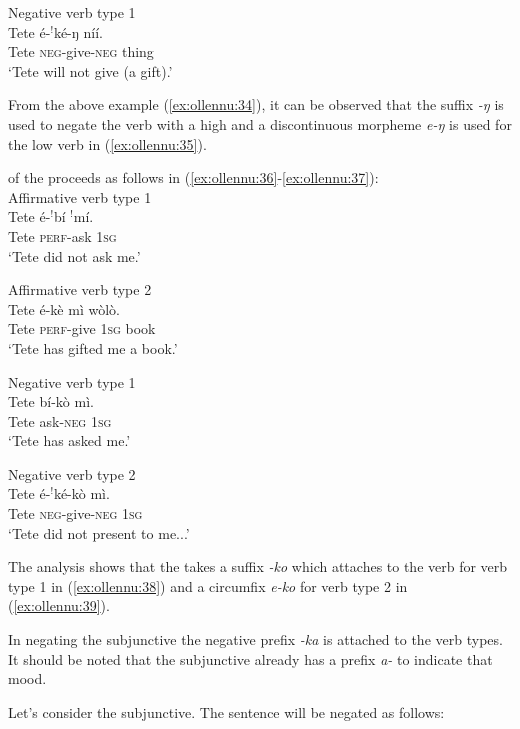 \documentclass[output=paper,newtxmath,modfonts,nonflat,draftmode]{langsci/langscibook}
\begin{document}
\ea Negative verb type 1 \\ \label{ex:ollennu:35}
\gll Tete é-$^{!}$ké-ŋ níí.\\
Tete \textsc{neg}-give-\textsc{neg} thing\\
\glt `Tete will not give (a gift).'\\
\z

From the above example (\ref{ex:ollennu:34}), it can be observed that the suffix \textit{-ŋ} is used to negate the verb with a high  and a discontinuous morpheme \textit{e-ŋ} is used for the low  verb in (\ref{ex:ollennu:35}).

 of the  proceeds as follows in (\ref{ex:ollennu:36}-\ref{ex:ollennu:37}):\\

\ea Affirmative verb type 1 \\\label{ex:ollennu:36}
\gll Tete é-$^{!}$bí $^{!}$mí.\\
Tete \textsc{perf}-ask 1\textsc{sg}\\
\glt `Tete did not ask me.'
\z


\ea Affirmative verb type 2 \\ \label{ex:ollennu:37}
\gll Tete é-kè mì wòlò.\\
Tete \textsc{perf}-give 1\textsc{sg} book\\
\glt `Tete has gifted me a book.'
\z


\ea Negative verb type 1 \\ \label{ex:ollennu:38}
\gll Tete bí-kò mì.\\
Tete ask-\textsc{neg} 1\textsc{sg}\\
\glt `Tete has asked me.'
\z


\ea Negative verb type 2 \\  \label{ex:ollennu:39}
 \gll Tete é-$^{!}$ké-kò mì.\\
Tete \textsc{neg}-give-\textsc{neg} 1\textsc{sg}\\
\glt `Tete did not present to me...'
\z
 
The analysis shows that the  takes a suffix \textit{-ko} which attaches to the verb for verb type 1 in (\ref{ex:ollennu:38}) and a circumfix \textit{e-ko} for verb type 2 in (\ref{ex:ollennu:39}).

In negating the subjunctive the negative prefix \textit{-ka} is attached to the verb types. It should be noted that the subjunctive already has a prefix \textit{a-} to indicate that mood.

Let’s consider the subjunctive. The sentence will be negated as follows:\\
\end{document}
